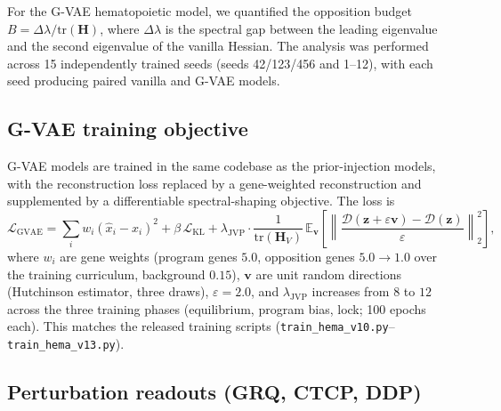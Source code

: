 For the G-VAE hematopoietic model, we quantified the opposition budget $B = \Delta\lambda / \mathrm{tr}(\mathbf{H})$, where $\Delta\lambda$ is the spectral gap between the leading eigenvalue and the second eigenvalue of the vanilla Hessian. The analysis was performed across 15 independently trained seeds (seeds 42/123/456 and 1--12), with each seed producing paired vanilla and G-VAE models.

\subsection*{G-VAE training objective}

G-VAE models are trained in the same codebase as the prior-injection models, with the reconstruction loss replaced by a gene-weighted reconstruction and supplemented by a differentiable spectral-shaping objective. The loss is
\begin{equation}
\mathcal{L}_{\mathrm{GVAE}} = \sum_i w_i (\hat{x}_i - x_i)^2 + \beta \, \mathcal{L}_{\mathrm{KL}} + \lambda_{\mathrm{JVP}} \cdot \frac{1}{\mathrm{tr}(\mathbf{H}_V)} \, \mathbb{E}_{\mathbf{v}} \left[ \left\| \frac{\mathcal{D}(\mathbf{z}+\varepsilon\mathbf{v}) - \mathcal{D}(\mathbf{z})}{\varepsilon} \right\|_2^2 \right],
\end{equation}
where $w_i$ are gene weights (program genes $5.0$, opposition genes $5.0\to1.0$ over the training curriculum, background $0.15$), $\mathbf{v}$ are unit random directions (Hutchinson estimator, three draws), $\varepsilon=2.0$, and $\lambda_{\mathrm{JVP}}$ increases from $8$ to $12$ across the three training phases (equilibrium, program bias, lock; 100 epochs each). This matches the released training scripts (\texttt{train\_hema\_v10.py}--\texttt{train\_hema\_v13.py}).

\subsection*{Perturbation readouts (GRQ, CTCP, DDP)}

